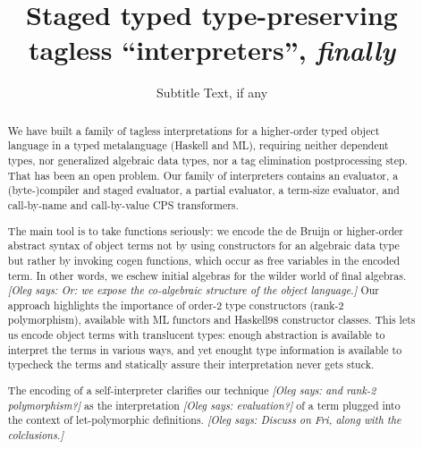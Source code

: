 \documentclass[preprint]{sigplanconf}
\newcommand{\oleg}[1]{{\it [Oleg says: #1]}}
\begin{document}
\copyrightdata{[to be supplied]} 


\title{Staged typed type-preserving tagless ``interpreters'', \emph{finally}}
\subtitle{Subtitle Text, if any}

\begin{comment}
\authorinfo{Jacques Carette}
           {McMaster University}
           {carette@mcmaster.ca}
\authorinfo{Oleg Kiselyov}
           {FNMOC}
           {oleg@pobox.com}
\authorinfo{Chung-chieh Shan}
           {Rutgers University}
           {ccshan@cs.rutgers.edu}
\end{comment}
\authorinfo{}{}{}

\maketitle

\begin{abstract}
We have built a family of tagless interpretations for a
higher-order typed object
language in a typed metalanguage (Haskell and ML), 
requiring neither dependent
types, nor generalized algebraic data types, nor a tag elimination 
postprocessing step. That has been an open problem.
Our family of interpreters contains 
an evaluator, a (byte-)compiler and staged evaluator, a partial
evaluator, a term-size evaluator, and call-by-name and
call-by-value CPS transformers.

The main tool is to take functions seriously: we encode the
de Bruijn or higher-order abstract syntax  of object terms 
not by using constructors for
an algebraic data type but rather by invoking cogen functions, which occur as
free variables in the encoded term.  In other words, we eschew initial
algebras for the wilder world of final algebras.
\oleg{Or: we expose the co-algebraic structure of the object language.}
Our approach highlights the importance of order-2 type constructors
(rank-2 polymorphism), available with ML functors and
Haskell98 constructor classes. This lets us encode object terms with
translucent types: enough abstraction is available to interpret the
terms in various ways, and yet enought type information is available 
to typecheck the terms and statically assure their interpretation
never gets stuck.

The encoding of a self-interpreter clarifies our technique 
\oleg{and rank-2 polymorphism?} 
as the
interpretation \oleg{evaluation?} of a term plugged into the context
of let-polymorphic definitions.
\oleg{Discuss on Fri, along with the colclusions.}
\end{abstract}
\end{document}
